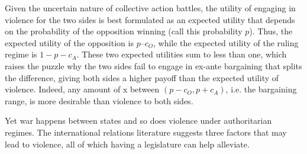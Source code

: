 \documentclass[12pt]{article}
\begin{document}
Given the uncertain nature of collective action battles, the utility of engaging in violence for the two sides is best formulated as an expected utility that depends on the probability of the opposition winning (call this probability $p$). Thus, the expected utility of the opposition is $p – c_O$, while the expected utility of the ruling regime is $1 - p - c_A$. These two expected utilities sum to less than one, which raises the puzzle why the two sides fail to engage in ex-ante bargaining that splits the difference, giving both sides a higher payoff than the expected utility of violence. Indeed, any amount of x between $(p - c_O, p + c_A)$, i.e. the bargaining range, is more desirable than violence to both sides.

Yet war happens between states and so does violence under authoritarian regimes. The international relations literature suggests three factors that may lead to violence, all of which having a legislature can help alleviate.
\end{document}
